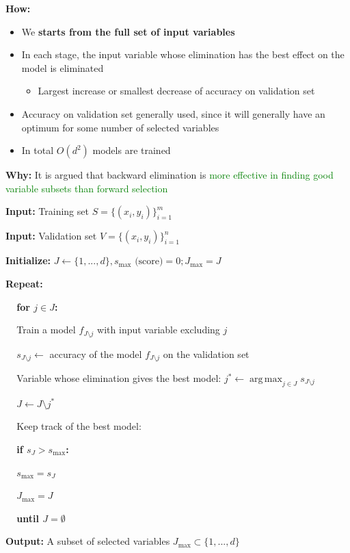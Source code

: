 \documentclass[12pt, a4paper]{article}
\DeclareMathOperator*{\argmax}{arg\,max} %
\begin{document}
\textbf{How:}
\begin{itemize}
  \item We \textbf{starts from the full set of input variables}
  \item In each stage, the input variable whose elimination has the best effect on the model is eliminated
  \begin{itemize}
    \item Largest increase or smallest decrease of accuracy on validation set
  \end{itemize}
  \item Accuracy on validation set generally used, since it will generally have an optimum for some number of selected variables
  \item In total $O(d^2)$ models are trained
\end{itemize}

\textbf{Why:} It is argued that backward elimination is \textcolor{Green}{more effective in finding good variable subsets than forward selection}


\begin{tcolorbox}[title={Backward elimination pseudo-code}]

  \textbf{Input:} Training set $S = \{(x_i,y_i)\}_{i=1}^m$

  \textbf{Input:} Validation set $V = \{(x_i,y_i)\}_{i=1}^n$

  \textbf{Initialize:} $J \leftarrow \{1,..., d\}, s_{\max} \text{ (score)} = 0; J_{\max} = J$

  \textbf{Repeat:}
  \begin{description}
    \item $\;\;\;$ \textbf{for $j \in J$:}
    \begin{description}
      \item $\;\;\;$ Train a model $f_{J \setminus j}$ with input variable excluding $j$
      \item $\;\;\;$ $s_{J \setminus j} \leftarrow$ accuracy of the model $f_{J \setminus j}$ on the validation set
    \end{description}
    \item $\;\;\;$ Variable whose elimination gives the best model: $j^* \leftarrow \argmax_{j \in J} s_{J \setminus j}$
    \item $\;\;\;$ $J \leftarrow J \setminus j^*$
    \item $\;\;\;$ Keep track of the best model:
    \item $\;\;\;$ \textbf{if $s_J > s_{\max}$:}
    \begin{description}
      \item $\;\;\;$ $s_{\max} = s_J$
      \item $\;\;\;$ $J_{\max} = J$
    \end{description}
    \item $\;\;\;$ \textbf{until $J = \emptyset$}
  \end{description}

  \textbf{Output:} A subset of selected variables $J_{\max} \subset \{1,..., d\}$
\end{tcolorbox}
\end{document}

